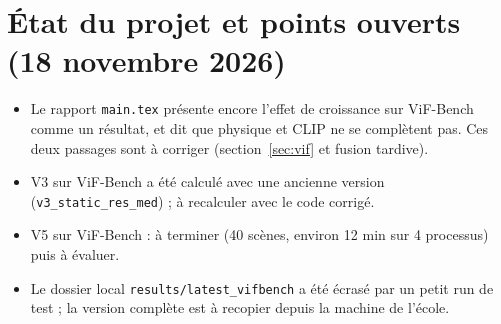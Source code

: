\documentclass[11pt,a4paper]{article}
\begin{document}
\appendix
\section{État du projet et points ouverts (18 novembre 2026)}
\begin{itemize}
  \item Le rapport \texttt{main.tex} présente encore l'effet de croissance sur ViF-Bench comme un
        résultat, et dit que physique et CLIP ne se complètent pas. Ces deux passages sont à corriger
        (section~\ref{sec:vif} et fusion tardive).
  \item V3 sur ViF-Bench a été calculé avec une ancienne version (\texttt{v3\_static\_res\_med}) ; à
        recalculer avec le code corrigé.
  \item V5 sur ViF-Bench : à terminer (40 scènes, environ 12 min sur 4 processus) puis à évaluer.
  \item Le dossier local \texttt{results/latest\_vifbench} a été écrasé par un petit run de test ; la
        version complète est à recopier depuis la machine de l'école.
\end{itemize}
\end{document}
